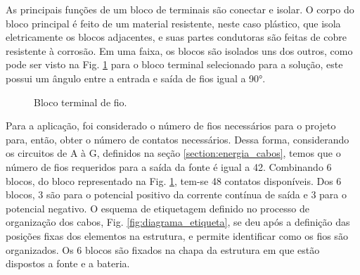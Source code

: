 As principais funções de um bloco de terminais são conectar e isolar. O corpo do bloco principal é feito de um material resistente, neste caso plástico, que isola eletricamente os blocos adjacentes, e suas partes condutoras são feitas de cobre resistente à corrosão. Em uma faixa, os blocos são isolados uns dos outros, como pode ser visto na Fig. \ref{fig:energia_bloco} para o bloco terminal selecionado para a solução, este possui um ângulo entre a entrada e saída de fios igual a 90°.

\begin{figure}[H]
\centering
{}
\qquad
{}
\caption{Bloco terminal de fio.}
\label{fig:energia_bloco}
\end{figure}

Para a aplicação, foi considerado o número de fios necessários para o projeto para, então, obter o número de contatos necessários. Dessa forma, considerando os circuitos de A à G, definidos na seção \ref{section:energia_cabos}, temos que o número de fios requeridos para a saída da fonte é igual a 42. Combinando 6 blocos, do bloco representado na Fig. \ref{fig:energia_bloco}, tem-se 48 contatos disponíveis. Dos 6 blocos, 3 são para o potencial positivo da corrente contínua de saída e 3 para o potencial negativo. O esquema de etiquetagem definido no processo de organização dos cabos, Fig. \ref{fig:diagrama_etiqueta}, se deu após a definição das posições fixas dos elementos na estrutura, e permite identificar como os fios são organizados. Os 6 blocos são fixados na chapa da estrutura em que estão dispostos a fonte e a bateria. 

